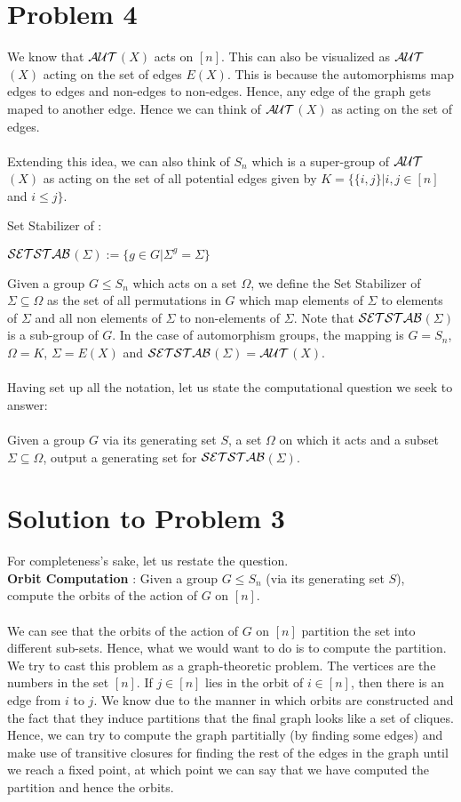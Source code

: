 \section{Problem 4}
We know that $\cal{AUT}$$(X)$ acts on $[n]$. This can also be visualized as $\cal{AUT}$$(X)$ acting on the set of edges $E(X)$. This is because the automorphisms map edges to edges and non-edges to non-edges. Hence, any edge of the graph gets maped to another edge. Hence we can think of $\cal{AUT}$$(X)$ as acting on the set of edges.\\\\
Extending this idea, we can also think of $S_n$ which is a super-group of $\cal{AUT}$$(X)$ as acting on the set of all potential edges given by $K = \{ \{i, j\} | i, j \in [n]$ and $i \le j\}$. 

\begin{definition}
	Set Stabilizer of \Sigma:
	\begin{center}
	$\cal{SETSTAB}$$(\Sigma) := \{ g \in G | \Sigma^{g} = \Sigma\}$
	\end{center}
\end{definition}
Given a group $G \le S_n$ which acts on a set $\Omega$, we define the Set Stabilizer of $\Sigma \subseteq \Omega$ as the set of all permutations in $G$ which map elements of $\Sigma$ to elements of $\Sigma$ and all non elements of $\Sigma$ to non-elements of $\Sigma$. Note that $\cal{SETSTAB}$$(\Sigma)$ is a sub-group of $G$. In the case of automorphism groups, the mapping is $G = S_n$, $\Omega = K$, $\Sigma = E(X)$ and $\cal{SETSTAB}$$(\Sigma)$$=$$\cal{AUT}$$(X)$.\\\\
Having set up all the notation, let us state the computational question we seek to answer:\\\\
Given a group $G$ via its generating set $S$, a set $\Omega$ on which it acts and a subset $\Sigma \subseteq \Omega$, output a generating set for $\cal{SETSTAB}$$(\Sigma)$.

\section{Solution to Problem 3}
For completeness's sake, let us restate the question.\\
{\bf Orbit Computation} : Given a group $G \le S_{n}$ (via its generating set $S$), compute the orbits of the action of $G$ on $[n]$.\\\\
We can see that the orbits of the action of $G$ on $[n]$ partition the set into different sub-sets. Hence, what we would want to do is to compute the partition. We try to cast this problem as a graph-theoretic problem.
The vertices are the numbers in the set $[n]$.
If $j \in [n]$ lies in the orbit of $i \in [n]$, then there is an edge from $i$ to $j$. We know due to the manner in which orbits are constructed and the fact that they induce partitions that the final graph looks like a set of cliques. Hence, we can try to compute the graph partitially (by finding some edges) and make use of transitive closures for finding the rest of the edges in the graph until we reach a fixed point, at which point we can say that we have computed the partition and hence the orbits.  
